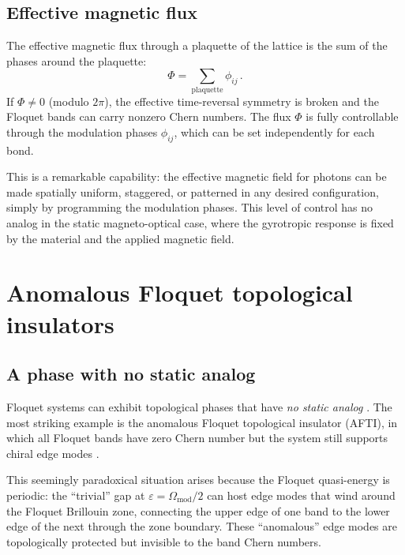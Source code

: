 \subsection{Effective magnetic flux}
\label{sec:ch13-flux}

The effective magnetic flux through a plaquette of the lattice is the
sum of the phases around the plaquette:
\begin{equation}\label{eq:ch13-flux-plaquette}
  \Phi = \sum_{\text{plaquette}} \phi_{ij}\,.
\end{equation}
If $\Phi\neq 0$ (modulo $2\pi$), the effective time-reversal symmetry
is broken and the Floquet bands can carry nonzero Chern numbers.  The
flux $\Phi$ is fully controllable through the modulation phases
$\phi_{ij}$, which can be set independently for each bond.

This is a remarkable capability: the effective magnetic field for
photons can be made spatially uniform, staggered, or patterned in any
desired configuration, simply by programming the modulation phases.
This level of control has no analog in the static magneto-optical
case, where the gyrotropic response is fixed by the material and the
applied magnetic field.

\section{Anomalous Floquet topological insulators}
\label{sec:ch13-anomalous}

\subsection{A phase with no static analog}
\label{sec:ch13-no-static}

Floquet systems can exhibit topological phases that have \emph{no static
analog} \cite{rudner2013anomalous}.  The most striking example is the anomalous Floquet topological
insulator (AFTI), in which all Floquet bands have zero Chern number but
the system still supports chiral edge modes
\cite{farrell2016edge,peng2016experimental}.

This seemingly paradoxical situation arises because the Floquet
quasi-energy is periodic: the ``trivial'' gap at
$\varepsilon=\Omega_{\mathrm{mod}}/2$ can host edge modes that wind
around the Floquet Brillouin zone, connecting the upper edge of one
band to the lower edge of the next through the zone boundary.  These
``anomalous'' edge modes are topologically protected but invisible to
the band Chern numbers.

